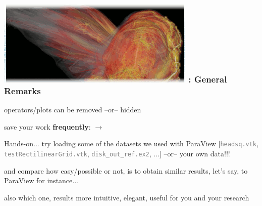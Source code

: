 














\begin{frame}
\frametitle{\href{https://wci.llnl.gov/simulation/computer-codes/visit/}{\includegraphics[height=.85cm]{figs/visit-logos/VisIt-03}} \hspace{-.85cm}{\bf \textcolor{lightgray}{VisIt}}: General Remarks}

\begin{beamerboxesrounded}[upper=block head,lower=block body,shadow=true]{}
        \textcolor{DarkBlue}{} operators/plots can be removed
                \framebox{\textcolor{DarkBlue}{\bf Delete}}
                --or--
                hidden \framebox{\textcolor{DarkBlue}{\bf Hide/Show}}

        \textcolor{DarkBlue}{} save your work {\bf frequently}:
                 $\rightarrow$ \framebox{\textcolor{DarkBlue}{\bf Save session...}}
\end{beamerboxesrounded}

\pause
\vspace{3mm}
\begin{beamerboxesrounded}[upper=block head,lower=block body,shadow=true]{Hands-on...}%
        \textcolor{DarkRed}{} try loading some of the datasets we used with ParaView [{\small \textcolor{gray}{\tt headsq.vtk}, \textcolor{gray}{\tt testRectilinearGrid.vtk}, \textcolor{gray}{\tt disk\_out\_ref.ex2}, ...}] --or-- your own data!!!

        \textcolor{DarkRed}{} and compare how easy/possible or not, is to obtain similar results, let's say, to ParaView for instance...

        \textcolor{DarkRed}{} also which one, results more intuitive, elegant, useful for you and your research
\end{beamerboxesrounded}
\end{frame}

